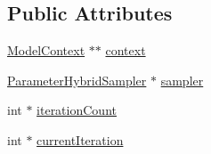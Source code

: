 \subsection*{Public Attributes}
\begin{DoxyCompactItemize}
\item 
\hyperlink{classSpatialSEIR_1_1ModelContext}{Model\-Context} $\ast$$\ast$ \hyperlink{classSpatialSEIR_1_1PerformHybridSE__EI__UpdateStep_a94eb8f51d2429aab817816ce7ebaf511}{context}
\item 
\hyperlink{classSpatialSEIR_1_1ParameterHybridSampler}{Parameter\-Hybrid\-Sampler} $\ast$ \hyperlink{classSpatialSEIR_1_1PerformHybridSE__EI__UpdateStep_a9afc7c610b2be704bc1517ce8b566534}{sampler}
\item 
int $\ast$ \hyperlink{classSpatialSEIR_1_1PerformHybridSE__EI__UpdateStep_adba72b268c525551ffd68721cfe766e1}{iteration\-Count}
\item 
int $\ast$ \hyperlink{classSpatialSEIR_1_1PerformHybridSE__EI__UpdateStep_a0e09a6ce9b5dad69515d3eb42367b525}{current\-Iteration}
\end{DoxyCompactItemize}


